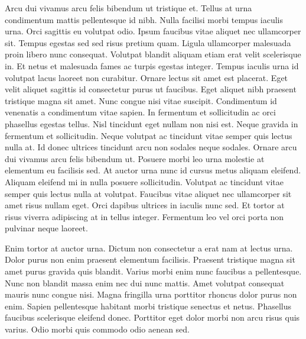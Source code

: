 \documentclass[a4]{report}
\begin{document}
Arcu dui vivamus arcu felis bibendum ut tristique et. Tellus at urna condimentum mattis pellentesque id nibh. Nulla facilisi morbi tempus iaculis urna. Orci sagittis eu volutpat odio. Ipsum faucibus vitae aliquet nec ullamcorper sit. Tempus egestas sed sed risus pretium quam. Ligula ullamcorper malesuada proin libero nunc consequat. Volutpat blandit aliquam etiam erat velit scelerisque in. Et netus et malesuada fames ac turpis egestas integer. Tempus iaculis urna id volutpat lacus laoreet non curabitur. Ornare lectus sit amet est placerat. Eget velit aliquet sagittis id consectetur purus ut faucibus. Eget aliquet nibh praesent tristique magna sit amet. Nunc congue nisi vitae suscipit. Condimentum id venenatis a condimentum vitae sapien. In fermentum et sollicitudin ac orci phasellus egestas tellus. Nisl tincidunt eget nullam non nisi est.
Neque gravida in fermentum et sollicitudin. Neque volutpat ac tincidunt vitae semper quis lectus nulla at. Id donec ultrices tincidunt arcu non sodales neque sodales. Ornare arcu dui vivamus arcu felis bibendum ut. Posuere morbi leo urna molestie at elementum eu facilisis sed. At auctor urna nunc id cursus metus aliquam eleifend. Aliquam eleifend mi in nulla posuere sollicitudin. Volutpat ac tincidunt vitae semper quis lectus nulla at volutpat. Faucibus vitae aliquet nec ullamcorper sit amet risus nullam eget. Orci dapibus ultrices in iaculis nunc sed. Et tortor at risus viverra adipiscing at in tellus integer. Fermentum leo vel orci porta non pulvinar neque laoreet.

Enim tortor at auctor urna. Dictum non consectetur a erat nam at lectus urna. Dolor purus non enim praesent elementum facilisis. Praesent tristique magna sit amet purus gravida quis blandit. Varius morbi enim nunc faucibus a pellentesque. Nunc non blandit massa enim nec dui nunc mattis. Amet volutpat consequat mauris nunc congue nisi. Magna fringilla urna porttitor rhoncus dolor purus non enim. Sapien pellentesque habitant morbi tristique senectus et netus. Phasellus faucibus scelerisque eleifend donec. Porttitor eget dolor morbi non arcu risus quis varius. Odio morbi quis commodo odio aenean sed.
\end{document}
